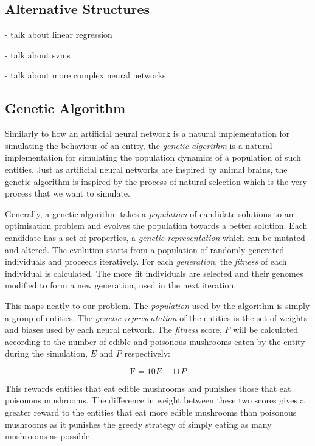 \documentclass[12pt,a4paper,twoside,openright]{report}
\begin{document}
\subsection{Alternative Structures}

- talk about linear regression

- talk about svms

- talk about more complex neural networks

\subsection{Genetic Algorithm}\label{section:genetic}

Similarly to how an artificial neural network is a natural implementation for simulating the behaviour of an entity, the \emph{genetic algorithm} is a natural implementation for simulating the population dynamics of a population of such entities. Just as artificial neural networks are inspired by animal brains, the genetic algorithm is inspired by the process of natural selection which is the very process that we want to simulate. 

Generally, a genetic algorithm takes a \emph{population} of candidate solutions to an optimisation problem and evolves the population towards a better solution. Each candidate has a set of properties, a \emph{genetic representation} which can be mutated and altered. The evolution starts from a population of randomly generated individuals and proceeds iteratively. For each \emph{generation}, the \emph{fitness} of each individual is calculated. The more fit individuals are selected and their genomes modified to form a new generation, used in the next iteration.

This maps neatly to our problem. The \emph{population} used by the algorithm is simply a group of entities. The \emph{genetic representation} of the entities is the set of weights and biases used by each neural network. The \emph{fitness} score, $F$ will be calculated according to the number of edible and poisonous mushrooms eaten by the entity during the simulation, $E$ and $P$ respectively:

\begin{equation}
\label{equation:fitness}
\mathrm{F} = 10 E- 11 P
\end{equation}

This rewards entities that eat edible mushrooms and punishes those that eat poisonous mushrooms. The difference in weight between these two scores gives a greater reward to the entities that eat more edible mushrooms than poisonous mushrooms as it punishes the greedy strategy of simply eating as many mushrooms as possible.
\end{document}
